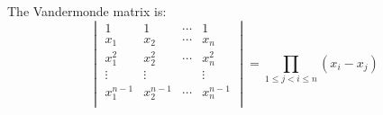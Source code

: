 \begin{theorem}[Vandermonde]
    The Vandermonde matrix is:
    \begin{equation}
        \begin{vmatrix}
        1 & 1  & \cdots  & 1  \\
        x_1  & x_2 & \cdots & x_n \\
        x_1^2 & x_2^2 & \cdots & x_n^2 \\
        \vdots & \vdots & & \vdots \\
        x_1^{n-1} & x_2^{n-1} & \cdots & x_n^{n-1} \\
        \end{vmatrix} = \prod_{1 \leq j < i \leq n}(x_i - x_j)
    \end{equation}
\end{theorem}
































































































